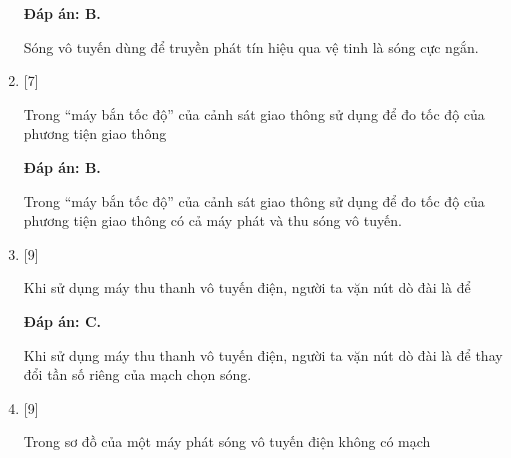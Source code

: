 \begin{enumerate}[label=\bfseries Câu \arabic*:]
	\loigiai
	{		\textbf{Đáp án: B.}
		
		Sóng vô tuyến dùng để truyền phát tín hiệu qua vệ tinh là sóng cực ngắn.
		
	}
	
	\item {} [7]
	\cauhoi
	{Trong “máy bắn tốc độ” của cảnh sát giao thông sử dụng để đo tốc độ của phương tiện giao thông
	}
	
	\loigiai
	{		\textbf{Đáp án: B.}
		
		Trong “máy bắn tốc độ” của cảnh sát giao thông sử dụng để đo tốc độ của phương tiện giao thông có cả máy phát và thu sóng vô tuyến.
		
	}
	
	\item {} [9]
	\cauhoi
	{Khi sử dụng máy thu thanh vô tuyến điện, người ta vặn nút dò đài là để
	}
	
	\loigiai
	{		\textbf{Đáp án: C.}
		
		Khi sử dụng máy thu thanh vô tuyến điện, người ta vặn nút dò đài là để thay đổi tần số riêng của mạch chọn sóng.
		
	}
	
	\item {} [9]
	\cauhoi
	{Trong sơ đồ của một máy phát sóng vô tuyến điện không có mạch
	}
	

\end{enumerate}
